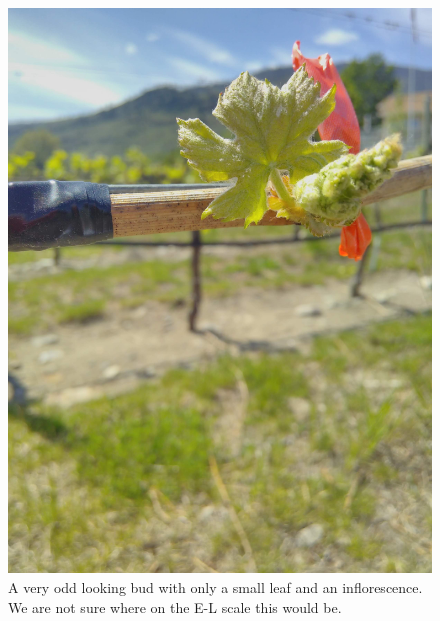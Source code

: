 \documentclass[11pt,letter]{article}
\begin{document}
\begin{figure}%
  \includegraphics[width=\linewidth]{WierdLeafandInflorenence.jpg}
  \caption{A very odd looking bud with only a small leaf and an inflorescence. We are not sure where on the E-L scale this would be.}
  \label{fig:wierdBud1}
\end{figure} 
\end{document}
